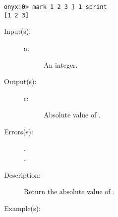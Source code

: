 \begin{description}
\begin{description}
\begin{verbatim}
onyx:0> mark 1 2 3 ] 1 sprint
[1 2 3]
		\end{verbatim}
	\end{description}
\label{systemdict:abs}
\item[{\onyxop{a}{abs}{r}}: ]
	\begin{description}\item[]
	\item[Input(s): ]
		\begin{description}\item[]
		\item[a: ]
			An integer.
		\end{description}
	\item[Output(s): ]
		\begin{description}\item[]
		\item[r: ]
			Absolute value of .
		\end{description}
	\item[Errors(s): ]
		\begin{description}\item[]
		\item[.]
		\item[.]
		\end{description}
	\item[Description: ]
		Return the absolute value of .
	\item[Example(s): ]\begin{verbatim}


\end{verbatim}
\end{description}
\end{description}
